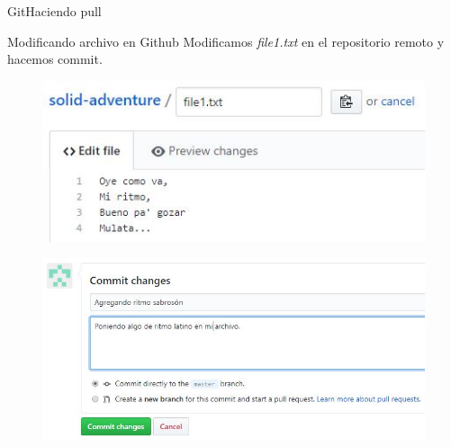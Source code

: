 \documentclass[10pt]{beamer}
\begin{document}
\begin{frame}{Git}{Haciendo pull}

\begin{block}{Modificando archivo en Github}
Modificamos \textit{file1.txt} en el repositorio remoto y hacemos commit.

\begin{figure}[h!]
\centering
\includegraphics [scale=0.35]{step9}
\label{fig:gitstatus}
\end{figure}

\begin{figure}[h!]
\centering
\includegraphics [scale=0.35]{step10}
\label{fig:gitstatus}
\end{figure}

\end{block}

\end{frame}
\end{document}
